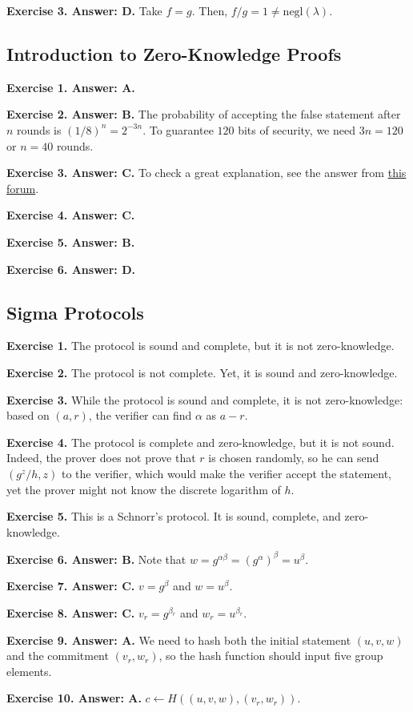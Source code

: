 \documentclass[../lecture-notes-148x210.tex]{subfiles}
\begin{document}
\textbf{Exercise 3. Answer: D.} Take $f=g$. Then, $f/g=1 \neq
\text{negl}(\lambda)$.

\subsection*{Introduction to Zero-Knowledge Proofs}

\textbf{Exercise 1. Answer: A.}

\textbf{Exercise 2. Answer: B.} The probability of accepting the false statement after 
$n$ rounds is $(1/8)^n=2^{-3n}$. To guarantee $120$ bits of security, we 
need $3n=120$ or $n=40$ rounds.

\textbf{Exercise 3. Answer: C.} To check a great explanation, see the answer
from
\href{https://crypto.stackexchange.com/questions/9528/zero-knowledge-proof-using-quadratic-residue-why-two-options}{this
forum}.

\textbf{Exercise 4. Answer: C.}

\textbf{Exercise 5. Answer: B.}

\textbf{Exercise 6. Answer: D.}

\subsection*{Sigma Protocols}

\textbf{Exercise 1.} The protocol is sound and complete, but it is not zero-knowledge.

\textbf{Exercise 2.} The protocol is not complete. Yet, it is sound and zero-knowledge.

\textbf{Exercise 3.} While the protocol is sound and complete, it is not zero-knowledge: 
based on $(a,r)$, the verifier can find $\alpha$ as $a-r$.

\textbf{Exercise 4.} The protocol is complete and zero-knowledge, but it is not
sound. Indeed, the prover does not prove that $r$ is chosen randomly, so he can
send $(g^z/h, z)$ to the verifier, which would make the verifier accept the
statement, yet the prover might not know the discrete logarithm of $h$.

\textbf{Exercise 5.} This is a Schnorr's protocol. It is sound, complete, and
zero-knowledge.

\textbf{Exercise 6. Answer: B.} Note that
$w=g^{\alpha\beta}=(g^{\alpha})^{\beta}=u^{\beta}$. 

\textbf{Exercise 7. Answer: C.} $v=g^{\beta}$ and $w=u^{\beta}$.

\textbf{Exercise 8. Answer: C.} $v_r=g^{\beta_r}$ and $w_r=u^{\beta_r}$.

\textbf{Exercise 9. Answer: A.} We need to hash both the initial statement
$(u,v,w)$ and the commitment $(v_r,w_r)$, so the hash function should input five 
group elements.

\textbf{Exercise 10. Answer: A.} $c \gets H((u,v,w),(v_r,w_r))$.
\end{document}
